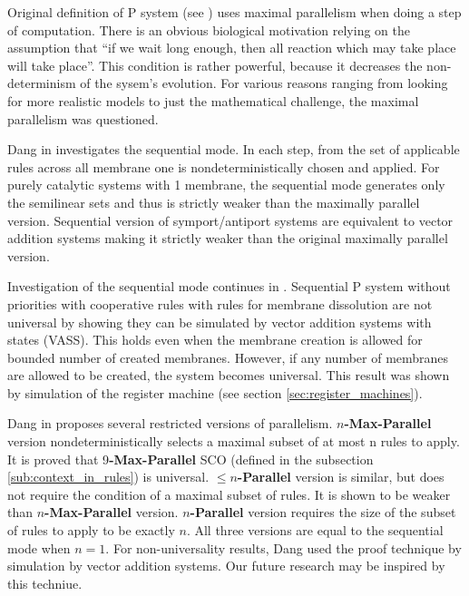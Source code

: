 Original definition of P system (see \cite{Paun98}) uses maximal parallelism when doing a step of computation. There is an obvious biological motivation relying on the assumption that ``if we wait long enough, then all reaction which may take place will take place''. This condition is rather powerful, because it decreases the non-determinism of the sysem's evolution. For various reasons ranging from looking for more realistic models to just the mathematical challenge, the maximal parallelism was questioned.


Dang in \cite{Dang04Sequential} investigates the sequential mode. In each step, from the set of applicable rules across all membrane one is nondeterministically chosen and applied. For purely catalytic systems with 1 membrane, the sequential mode generates only the semilinear sets and thus is strictly weaker than the maximally parallel version.
Sequential version of symport/antiport systems are equivalent to vector addition systems making it strictly weaker than the original maximally parallel version.

Investigation of the sequential mode continues in \cite{Dang:2005:Sequential}. Sequential P system without priorities with cooperative rules with rules for membrane dissolution are not universal by showing they can be simulated by vector addition systems with states (VASS).
This holds even when the membrane creation is allowed for bounded number of created membranes. However, if any number of membranes are allowed to be created, the system becomes universal. This result was shown by simulation of the register machine (see section \ref{sec:register_machines}).


Dang in \cite{Ibarra04dang} proposes several restricted versions of parallelism.
$n${\bf -Max-Parallel} version nondeterministically selects a maximal subset of at most n rules to apply. It is proved that 9{\bf -Max-Parallel} SCO (defined in the subsection \ref{sub:context_in_rules}) is universal.
$\leq n${\bf -Parallel} version is similar, but does not require the condition of a maximal subset of rules. It is shown to be weaker than $n${\bf -Max-Parallel} version.
$n${\bf -Parallel} version requires the size of the subset of rules to apply to be exactly $n$.
All three versions are equal to the sequential mode when $n=1$. For non-universality results, Dang used the proof technique by simulation by vector addition systems. Our future research may be inspired by this techniue.

